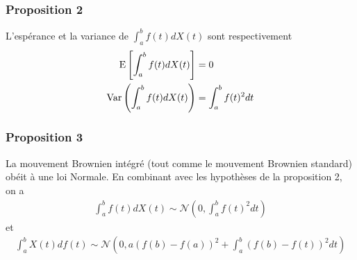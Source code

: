 \documentclass[10pt, french, landscape]{article}
\begin{document}
\begin{multicols*}{2}
\subsubsection*{Proposition 2}
L'espérance et la variance de $\int_{a}^{b} f(t) d X(t) $ sont respectivement
\begin{align*}
\mathrm{E} \left[ \int_{a}^{b} f(t) d X(t)  \right] & = 0 \\
\mathrm{Var} \left( \int_{a}^{b} f(t) d X(t)   \right) & =  \int_{a}^{b} f(t)^2 dt \\
\end{align*}


\subsubsection*{Proposition 3}
La mouvement Brownien intégré (tout comme le mouvement Brownien standard) obéit à une loi Normale. En combinant avec les hypothèses de la proposition 2, on a
\begin{align*}
\int_{a}^{b} f(t) d X(t) \sim \mathcal{N} \left( 0 , \int_{a}^{b} f(t)^2 dt \right)
\end{align*}
et
\begin{align*}
\int_{a}^{b} X(t) d f(t) \sim \mathcal{N} \left( 0, a\left(f(b) - f(a)\right)^2 + \int_{a}^{b} \left( f(b) - f(t) \right)^2 dt \right)
\end{align*}





\end{multicols*}

\end{document}
